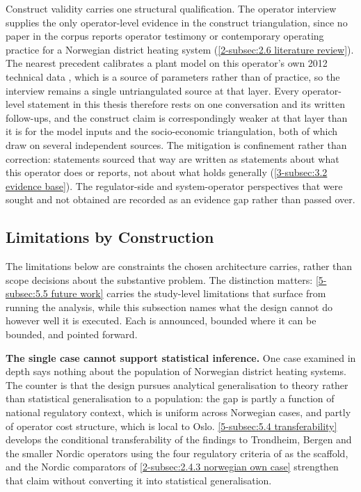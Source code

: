 Construct validity carries one structural qualification. The operator interview supplies the only operator-level evidence in the construct triangulation, since no paper in the corpus reports operator testimony or contemporary operating practice for a Norwegian district heating system (\autoref{2-subsec:2.6 literature review}). The nearest precedent calibrates a plant model on this operator's own 2012 technical data \cite{kirkerud_impacts_2016}, which is a source of parameters rather than of practice, so the interview remains a single untriangulated source at that layer. Every operator-level statement in this thesis therefore rests on one conversation and its written follow-ups, and the construct claim is correspondingly weaker at that layer than it is for the model inputs and the socio-economic triangulation, both of which draw on several independent sources. The mitigation is confinement rather than correction: statements sourced that way are written as statements about what this operator does or reports, not about what holds generally (\autoref{3-subsec:3.2 evidence base}). The regulator-side and system-operator perspectives that were sought and not obtained are recorded as an evidence gap rather than passed over.

\subsection{Limitations by Construction}
\label{3-subsec:3.10 limitations}

The limitations below are constraints the chosen architecture carries, rather than scope decisions about the substantive problem. The distinction matters: \autoref{5-subsec:5.5 future work} carries the study-level limitations that surface from running the analysis, while this subsection names what the design cannot do however well it is executed. Each is announced, bounded where it can be bounded, and pointed forward.

\textbf{The single case cannot support statistical inference.} One case examined in depth says nothing about the population of Norwegian district heating systems. The counter is that the design pursues analytical generalisation to theory rather than statistical generalisation to a population: the gap is partly a function of national regulatory context, which is uniform across Norwegian cases, and partly of operator cost structure, which is local to Oslo. \autoref{5-subsec:5.4 transferability} develops the conditional transferability of the findings to Trondheim, Bergen and the smaller Nordic operators using the four regulatory criteria of \cite{bergaentzle_electricity_2019} as the scaffold, and the Nordic comparators of \autoref{2-subsec:2.4.3 norwegian own case} strengthen that claim without converting it into statistical generalisation.

